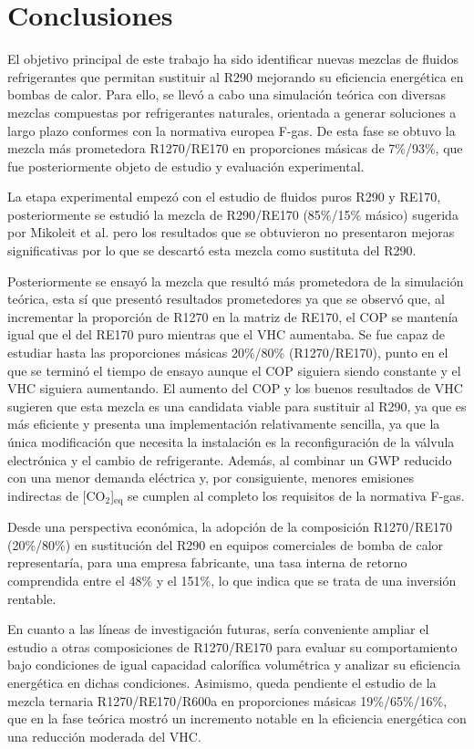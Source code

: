 \documentclass[../main.tex]{subfiles}
\begin{document}
\section{Conclusiones}

El objetivo principal de este trabajo ha sido identificar nuevas mezclas de fluidos refrigerantes que permitan sustituir al R290 mejorando su eficiencia energética en bombas de calor. Para ello, se llevó a cabo una simulación teórica con diversas mezclas compuestas por refrigerantes naturales, orientada a generar soluciones a largo plazo conformes con la normativa europea F-gas. De esta fase se obtuvo la mezcla más prometedora R1270/RE170 en proporciones másicas de 7\%/93\%, que fue posteriormente objeto de estudio y evaluación experimental.

La etapa experimental empezó con el estudio de fluidos puros R290 y RE170, posteriormente se estudió la mezcla de R290/RE170 (85\%/15\% másico) sugerida por Mikoleit et al. \cite{Mickoleit_2026} pero los resultados que se obtuvieron no presentaron mejoras significativas por lo que se descartó esta mezcla como sustituta del R290.

Posteriormente se ensayó la mezcla que resultó más prometedora de la simulación teórica, esta sí que presentó resultados prometedores ya que se observó que, al incrementar la proporción de R1270 en la matriz de RE170, el COP se mantenía igual que el del RE170 puro mientras que el VHC aumentaba. Se fue capaz de estudiar hasta las proporciones másicas 20\%/80\% (R1270/RE170), punto en el que se terminó el tiempo de ensayo aunque el COP siguiera siendo constante y el VHC siguiera aumentando. El aumento del COP y los buenos resultados de VHC sugieren que esta mezcla es una candidata viable para sustituir al R290, ya que es más eficiente y presenta una implementación relativamente sencilla, ya que la única modificación que necesita la instalación es la reconfiguración de la válvula electrónica y el cambio de refrigerante. Además, al combinar un GWP reducido con una menor demanda eléctrica y, por consiguiente, menores emisiones indirectas de [CO$_\text{2}$]$_\text{eq}$ se cumplen al completo los requisitos de la normativa F-gas.

Desde una perspectiva económica, la adopción de la composición R1270/RE170 (20\%/80\%) en sustitución del R290 en equipos comerciales de bomba de calor representaría, para una empresa fabricante, una tasa interna de retorno comprendida entre el 48\% y el 151\%, lo que indica que se trata de una inversión rentable.

En cuanto a las líneas de investigación futuras, sería conveniente ampliar el estudio a otras composiciones de R1270/RE170 para evaluar su comportamiento bajo condiciones de igual capacidad calorífica volumétrica y analizar su eficiencia energética en dichas condiciones. Asimismo, queda pendiente el estudio de la mezcla ternaria R1270/RE170/R600a en proporciones másicas 19\%/65\%/16\%, que en la fase teórica mostró un incremento notable en la eficiencia energética con una reducción moderada del VHC.


\newpage
\end{document}
